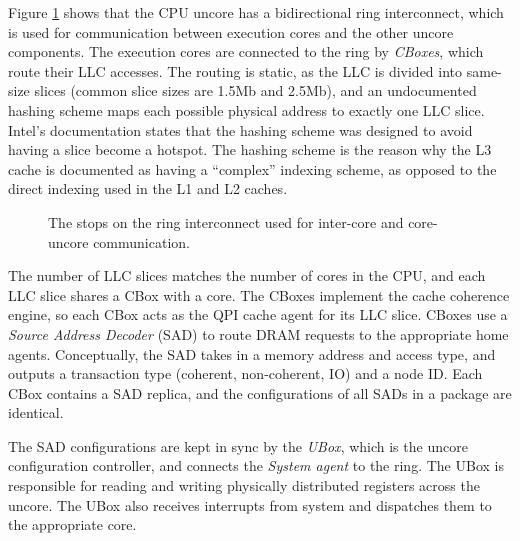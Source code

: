 
Figure \ref{fig:cpu_uncore} shows that the CPU uncore has a bidirectional ring
interconnect, which is used for communication between execution cores and the
other uncore components. The execution cores are connected to the ring by
\textit{CBoxes}, which route their LLC accesses. The routing is static, as the
LLC is divided into same-size slices (common slice sizes are 1.5Mb and 2.5Mb),
and an undocumented hashing scheme maps each possible physical address to
exactly one LLC slice. Intel's documentation states that the hashing scheme was
designed to avoid having a slice become a hotspot. The hashing scheme is the
reason why the L3 cache is documented as having a ``complex'' indexing scheme,
as opposed to the direct indexing used in the L1 and L2 caches.

\begin{figure}[hbt]
  \caption{
    The stops on the ring interconnect used for inter-core and core-uncore
    communication.
  }
  \label{fig:cpu_uncore}
\end{figure}


The number of LLC slices matches the number of cores in the CPU, and each LLC
slice shares a CBox with a core. The CBoxes implement the cache coherence
engine, so each CBox acts as the QPI cache agent for its LLC slice. CBoxes
use a \textit{Source Address Decoder} (SAD) to route DRAM requests to the
appropriate home agents. Conceptually, the SAD takes in a memory address and
access type, and outputs a transaction type (coherent, non-coherent, IO) and a
node ID. Each CBox contains a SAD replica, and the configurations of all SADs
in a package are identical.

The SAD configurations are kept in sync by the \textit{UBox}, which is the
uncore configuration controller, and connects the \textit{System agent} to the
ring. The UBox is responsible for reading and writing physically distributed
registers across the uncore. The UBox also receives interrupts from system and
dispatches them to the appropriate core.

